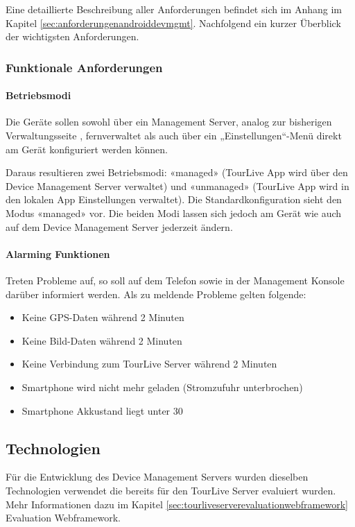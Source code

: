 Eine detaillierte Beschreibung aller Anforderungen befindet sich im Anhang im Kapitel \ref{sec:anforderungenandroiddevmgmt}. Nachfolgend ein kurzer Überblick der wichtigsten Anforderungen.

\subsubsection{Funktionale Anforderungen}
\paragraph{Betriebsmodi}
Die Geräte sollen sowohl über ein Management Server, analog zur bisherigen Verwaltungsseite , fernverwaltet als auch über ein „Einstellungen“-Menü direkt am Gerät konfiguriert werden können. 

Daraus resultieren zwei Betriebsmodi: «managed» (TourLive App wird über den Device Management Server verwaltet) und «unmanaged» (TourLive App wird in den lokalen App Einstellungen verwaltet). Die Standardkonfiguration sieht den Modus «managed» vor. Die beiden Modi lassen sich jedoch am Gerät wie auch auf dem Device Management Server jederzeit ändern. 


\paragraph{Alarming Funktionen}
Treten Probleme auf, so soll auf dem Telefon sowie in der Management Konsole darüber informiert werden. Als zu meldende Probleme gelten folgende:
\begin{itemize}
\item Keine GPS-Daten während 2 Minuten
\item Keine Bild-Daten während 2 Minuten
\item Keine Verbindung zum TourLive Server während 2 Minuten
\item Smartphone wird nicht mehr geladen (Stromzufuhr unterbrochen)
\item Smartphone Akkustand liegt unter 30%
\end{itemize}
	
\subsection{Technologien}
Für die Entwicklung des Device Management Servers wurden dieselben Technologien verwendet die bereits für den TourLive Server evaluiert wurden. Mehr Informationen dazu im Kapitel  \ref{sec:tourliveserverevaluationwebframework} Evaluation Webframework.

